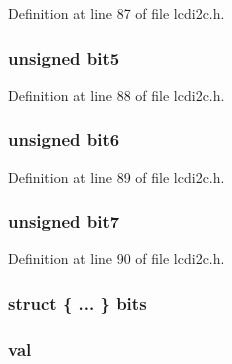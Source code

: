 Definition at line 87 of file lcdi2c.\-h.

\hypertarget{union___byte___aac6dabd343d82afedb3e175c7960b2d0}{
\subsubsection[{bit5}]{\setlength{\rightskip}{0pt plus 5cm}unsigned bit5}}\label{union___byte___aac6dabd343d82afedb3e175c7960b2d0}


Definition at line 88 of file lcdi2c.\-h.

\hypertarget{union___byte___a6ea1dee0891a483350d275761ad97c1a}{
\subsubsection[{bit6}]{\setlength{\rightskip}{0pt plus 5cm}unsigned bit6}}\label{union___byte___a6ea1dee0891a483350d275761ad97c1a}


Definition at line 89 of file lcdi2c.\-h.

\hypertarget{union___byte___a1c1d68aa52ca32b5df0afaf1e83e59ed}{
\subsubsection[{bit7}]{\setlength{\rightskip}{0pt plus 5cm}unsigned bit7}}\label{union___byte___a1c1d68aa52ca32b5df0afaf1e83e59ed}


Definition at line 90 of file lcdi2c.\-h.

\hypertarget{union___byte___a837b65c8cf71bb4347b760ea732b8f11}{
\subsubsection[{bits}]{\setlength{\rightskip}{0pt plus 5cm}struct \{ ... \}   bits}}\label{union___byte___a837b65c8cf71bb4347b760ea732b8f11}
\hypertarget{union___byte___a5d0cde7a426451812b691b5ae4a01560}{
\subsubsection[{val}]{ val}}\label{union___byte___a5d0cde7a426451812b691b5ae4a01560}


